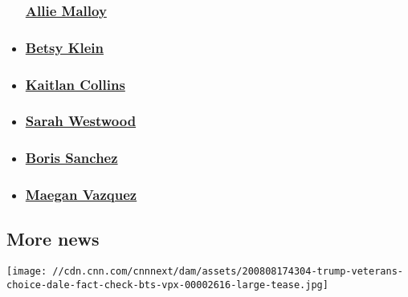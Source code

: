 \begin{itemize}
{  \subsubsection{\texorpdfstring{\href{/profiles/allie-malloy}{Allie
  Malloy}}{Allie Malloy}}\label{allie-malloy}}
\item
  \hypertarget{betsy-klein}{%
  \subsubsection{\texorpdfstring{\href{/profiles/betsy-klein}{Betsy
  Klein}}{Betsy Klein}}\label{betsy-klein}}
\item
  \hypertarget{kaitlan-collins}{%
  \subsubsection{\texorpdfstring{\href{/profiles/kaitlan-collins}{Kaitlan
  Collins}}{Kaitlan Collins}}\label{kaitlan-collins}}
\item
  \hypertarget{sarah-westwood}{%
  \subsubsection{\texorpdfstring{\href{/profiles/sarah-westwood}{Sarah
  Westwood}}{Sarah Westwood}}\label{sarah-westwood}}
\item
  \hypertarget{boris-sanchez}{%
  \subsubsection{\texorpdfstring{\href{/profiles/boris-sanchez-profile}{Boris
  Sanchez}}{Boris Sanchez}}\label{boris-sanchez}}
\item
  \hypertarget{maegan-vazquez}{%
  \subsubsection{\texorpdfstring{\href{/profiles/maegan-vazquez}{Maegan
  Vazquez}}{Maegan Vazquez}}\label{maegan-vazquez}}
\end{itemize}

\hypertarget{more-news-}{%
\subsection{More news~}\label{more-news-}}

\href{/2020/08/08/politics/trump-veterans-choice-paula-reid/index.html}{}

\texttt{[image: //cdn.cnn.com/cnnnext/dam/assets/200808174304-trump-veterans-choice-dale-fact-check-bts-vpx-00002616-large-tease.jpg]}

